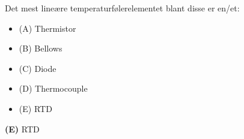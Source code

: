 

Det mest lineære temperaturfølerelementet blant disse er en/et:

\begin{itemize}
\item{(A)} Thermistor
\vskip 5pt 
\item{(B)} Bellows
\vskip 5pt 
\item{(C)} Diode
\vskip 5pt 
\item{(D)} Thermocouple
\vskip 5pt 
\item{(E)} RTD
\end{itemize}







{\bf (E)} RTD
 









